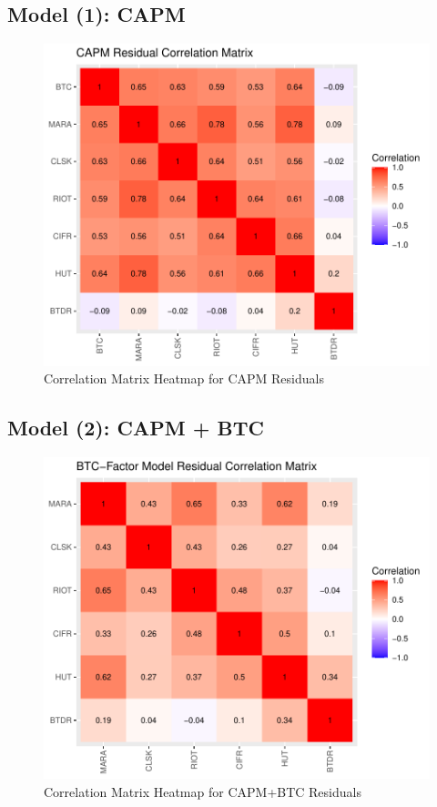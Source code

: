 \documentclass[]{article}
\begin{document}
\subsection{Model (1): CAPM}

\begin{figure}[htbp]
	\label{capm_resid_corplot}
	\caption{Correlation Matrix Heatmap for CAPM Residuals}
	\includegraphics[width=\linewidth]{capm_resid_corplot.pdf}
\end{figure}

\subsection{Model (2): CAPM + BTC}

\begin{figure}[htbp]
	\label{bfm_resid_corplot}
	\caption{Correlation Matrix Heatmap for CAPM+BTC Residuals}
	\includegraphics[width=\linewidth]{bfm_resid_corplot.pdf}
\end{figure}
\end{document}
